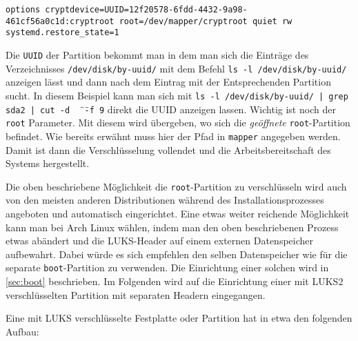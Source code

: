 \begin{lstlisting}[caption=\texttt{/boot/loader/entries/arch\_hardened.conf} Eintrag, label=lst_entries]
	options cryptdevice=UUID=12f20578-6fdd-4432-9a98-461cf56a0c1d:cryptroot root=/dev/mapper/cryptroot quiet rw systemd.restore_state=1
\end{lstlisting}

Die \texttt{UUID} der Partition bekommt man in dem man sich die Einträge des Verzeichnisses \texttt{/dev/disk/by-uuid/} mit dem Befehl \texttt{ls -l /dev/disk/by-uuid/} anzeigen lässt und dann nach dem Eintrag mit der Entsprechenden Partition sucht. In diesem Beispiel kann man sich mit \texttt{ls -l /dev/disk/by-uuid/ | grep sda2 | cut -d \" \ \" \ -f 9} direkt die UUID anzeigen lassen. Wichtig ist noch der \texttt{root} Parameter. Mit diesem wird übergeben, wo sich die \emph{geöffnete} \texttt{root}-Partition befindet. Wie bereits erwähnt muss hier der Pfad in \texttt{mapper} angegeben werden. Damit ist dann die Verschlüsselung vollendet und die Arbeitsbereitschaft des Systems hergestellt.

Die oben beschriebene Möglichkeit die \texttt{root}-Partition zu verschlüsseln wird auch von den meisten anderen Distributionen während des Installationsprozesses angeboten und automatisch eingerichtet. Eine etwas weiter reichende Möglichkeit kann man bei Arch Linux wählen, indem man den oben beschriebenen Prozess etwas abändert und die \ac{LUKS}-Header auf einem externen Datenspeicher aufbewahrt. Dabei würde es sich empfehlen den selben Datenspeicher wie für die separate \texttt{boot}-Partition zu verwenden. Die Einrichtung einer solchen wird in \autoref{sec:boot} beschrieben. Im Folgenden wird auf die Einrichtung einer mit \ac{LUKS}2 verschlüsselten Partition mit separaten Headern eingegangen.

Eine mit \ac{LUKS} verschlüsselte Festplatte oder Partition hat in etwa den folgenden Aufbau:

\vspace{.25cm}

\begin{minipage}{\textwidth}
	\centering
\end{minipage}

\vspace{.25cm}

